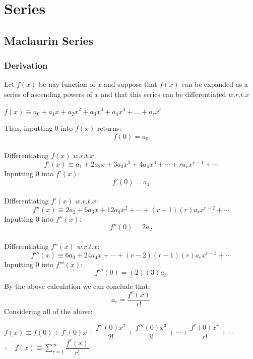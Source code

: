 \documentclass[12pt, a4paper]{report}
\theoremstyle{definition}
\begin{document}
	\hrulefill
	
	
	
	
	\chapter{Series}
	\section{Maclaurin Series}
	\subsection{Derivation}
	Let $f(x)$ be nay function of $ x $ and suppose that $ f(x) $ can be expanded as a series of ascending powers of $ x $ and that this series can be differentiated $ w.r.t. x $
	\begin{center}
		$	f(x) \equiv a_0   + a_{1}x  + a_{2}x^2 + a_{3}x^3 + a_{4}x^4 + ... +	 a_{r}x^r$\\
	\end{center}
	Thus, inputting $0$ into $f(x)$ returns:
	$$\boxed{f(0) = a_{0}}$$\\
	Differentiating  $f(x)$ $w.r.t.x\colon$ 
	$$f'(x) \equiv a_{1} + 2a_{2}x + 3a_{3}x^2 + 4a_4x^3 + \cdots + ra_{r}x^{r-1} + \cdots$$
	Inputting $0$ into $f'(x)\colon$
	$$\boxed{f'(0) = a_1}$$\\
	Differentiating $f'(x)$ $w.r.t.x\colon$
	$$f''(x) \equiv 2a_{2} + 6a_{3}x + 12a_4x^2 + \cdots + (r-1)(r)a_{r}x^{r-2} + \cdots$$
	Inputting $0$ into $f''(x)\colon$
	$$\boxed{f''(0) = 2a_2}$$\\
	Differentiating $f''(x)$ $w.r.t.x\colon$
	$$f'''(x) \equiv 6a_{3} +24a_4x + \cdots + (r-2)(r-1)(r)a_{r}x^{r-3}+ \cdots$$
	Inputting $0$ into $f'''(x)\colon$
	$$\boxed{f'''(0) = (2)(3)a_3}$$
	$$\vdots$$
	\newpage
	By the above calculation we can conclude that: 
	$$\boxed{a_r = \frac{f^r(x)}{r!}}$$
	Considering all of the above: 
	
	\begin{center}
		\begin{tcolorbox}[center title,hbox,    %
			lifted shadow={1mm}{-2mm}{3mm}{0.1mm}%
			{black!50!white}]
			\begin{varwidth}{\textwidth}
				\begin{center}
					$f(x) \equiv f(0) + f'(0)x + \dfrac{f''(0)x^2}{2!} + \dfrac{f'''(0)x^3}{3!} + \cdots + \dfrac{f^r(0)x^r}{r!} + \cdots$\\
					\bigskip
					$\displaystyle \therefore \quad f(x) \equiv \sum_{r=1}^{\infty} \dfrac{f^r(x)}{r!}$
				\end{center}
			\end{varwidth}
		\end{tcolorbox} 
	\end{center}
	
\end{document}
